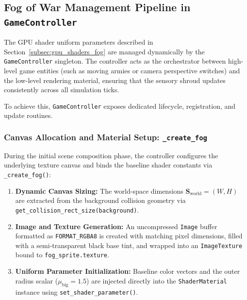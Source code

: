 \subsection{Fog of War Management Pipeline in \texttt{GameController}}
\label{subsec:fog_controller_management}

The GPU shader uniform parameters described in Section~\ref{subsec:gpu_shaders_fog} are managed dynamically by the \texttt{GameController} singleton. The controller acts as the orchestrator between high-level game entities (such as moving armies or camera perspective switches) and the low-level rendering material, ensuring that the sensory shroud updates consistently across all simulation ticks.

To achieve this, \texttt{GameController} exposes dedicated lifecycle, registration, and update routines.

\subsubsection{Canvas Allocation and Material Setup: \texttt{\_create\_fog}}
During the initial scene composition phase, the controller configures the underlying texture canvas and binds the baseline shader constants via \texttt{\_create\_fog()}:

\begin{enumerate}
    \item \textbf{Dynamic Canvas Sizing:} The world-space dimensions $\mathbf{S}_{\text{world}} = (W, H)$ are extracted from the background collision geometry via \texttt{get\_collision\_rect\_size(background)}.
    \item \textbf{Image and Texture Generation:} An uncompressed \texttt{Image} buffer formatted as \texttt{FORMAT\_RGBA8} is created with matching pixel dimensions, filled with a semi-transparent black base tint, and wrapped into an \texttt{ImageTexture} bound to \texttt{fog\_sprite.texture}.
    \item \textbf{Uniform Parameter Initialization:} Baseline color vectors and the outer radius scalar ($\mu_{\text{big}} = 1.5$) are injected directly into the \texttt{ShaderMaterial} instance using \texttt{set\_shader\_parameter()}.
\end{enumerate}

